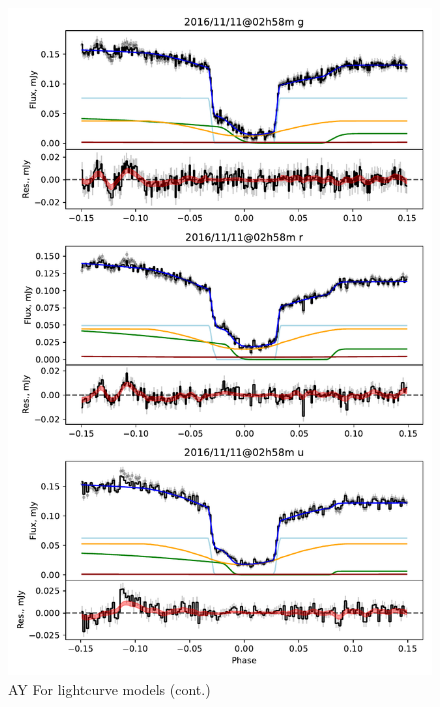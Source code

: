 \begin{figure}
    \centering
    \includegraphics[width=\textwidth]{figures/results/AYFor/AYFor_3.pdf}
    \caption{AY For lightcurve models (cont.)}
    \label{fig:AYFor all lightcurves cont 2}
\end{figure}
